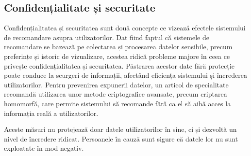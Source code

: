 \subsection{Confidențialitate și securitate}
\label{subsec:ch3sec4sub3}
Confidențialitatea și securitatea sunt două concepte ce vizează efectele sistemului de recomandare asupra utilizatorilor.
Dat fiind faptul că sistemele de recomandare se bazează pe colectarea și procesarea datelor sensibile, precum preferințe și istoric de vizualizare, acestea ridică probleme majore în ceea ce privește confidențialitatea și securitatea.
Păstrarea acestor date fără protecție poate conduce la scurgeri de informații, afectând eficiența sistemului și încrederea utilizatorilor\cite{huang2019privacy}.
Pentru prevenirea expunerii datelor, un articol de specialitate recomandă utilizarea unor metode criptografice avansate, precum criptarea homomorfă, care permite sistemului să recomande fără ca el să aibă acces la informația reală a utilizatorilor\cite{badsha2016practical}.
\par
Aceste măsuri nu protejează doar datele utilizatorilor în sine, ci și dezvoltă un nivel de încredere ridicat. 
Persoanele în cauză sunt sigure că datele lor nu sunt exploatate în mod negativ.